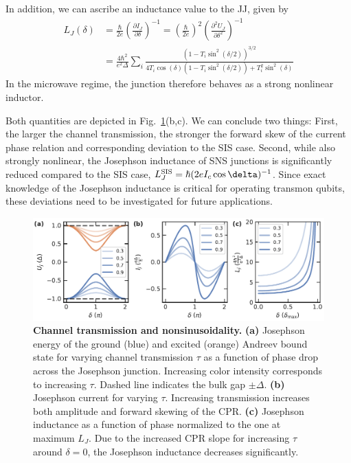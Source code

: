In addition, we can ascribe an inductance value to the JJ, given by
%
\begin{align}
L_J(\delta) &= \frac{\hbar}{2e}\left( \frac{\partial I_J}{\partial\delta} \right)^{-1} = \left(\frac{\hbar}{2e}\right)^2\left(\frac{\partial^2U_J}{\partial\delta^2}\right)^{-1} \nonumber\\
&= \frac{4\hbar^2}{e^2\Delta}\sum_i \frac{\left(1-T_i\sin^2(\delta/2)\right)^{3/2}}{4T_i\cos(\delta)\left(1-T_i\sin^2(\delta/2)\right)+T_i^2\sin^2(\delta)}
\end{align} 
%
In the microwave regime, the junction therefore behaves as a strong nonlinear inductor.

Both quantities are depicted in Fig.~\ref{fig:modelsnsejic}(b,c).
%
We can conclude two things:
%
First, the larger the channel transmission, the stronger the forward skew of the current phase relation and corresponding deviation to the SIS case.
%
Second, while also strongly nonlinear, the Josephson inductance of SNS junctions is significantly reduced compared to the SIS case, $L_J^{\rm SIS}=\hbar(2eI_c\cos\delta)^{-1}$.
%
Since exact knowledge of the Josephson inductance is critical for operating transmon qubits, these deviations need to be investigated for future applications. 

\begin{figure}[t]
	\centering
	\includegraphics[width=\linewidth]{chapter-introduction/figs/model_SNS_EjIc}
	\caption{
		\textbf{Channel transmission and nonsinusoidality.}
		\textbf{(a)} Josephson energy of the ground (blue) and excited (orange) Andreev bound state for varying channel transmission $\tau$ as a function of phase drop across the Josephson junction.
		Increasing color intensity corresponds to increasing $\tau$.
		Dashed line indicates the bulk gap $\pm\Delta$.
		\textbf{(b)} Josephson current for varying $\tau$.
		Increasing transmission increases both amplitude and forward skewing of the CPR.
		\textbf{(c)} Josephson inductance as a function of phase normalized to the one at maximum $L_J$.
		Due to the increased CPR slope for increasing $\tau$ around $\delta=0$, the Josephson inductance decreases significantly.
	}
	\label{fig:modelsnsejic}
\end{figure}

